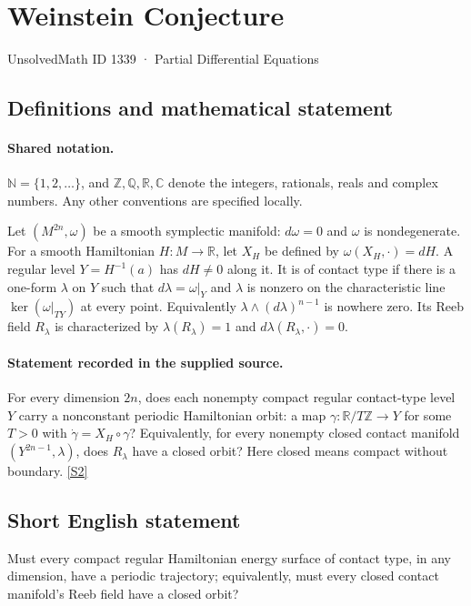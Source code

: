 \documentclass[11pt]{article}
\newcommand{\sref}[2]{\hyperlink{source:#1:#2}{[S#2]}}
\begin{document}
\setcounter{section}{1338}
\section{Weinstein Conjecture}\label{1339}
{\small\sffamily UnsolvedMath ID 1339 · Partial Differential Equations}
\subsection{Definitions and mathematical statement}

\paragraph{Shared notation.}$\mathbb N=\{1,2,\ldots\}$, and $\mathbb Z,\mathbb Q,\mathbb R,\mathbb C$ denote the integers, rationals, reals and complex numbers. Any other conventions are specified locally.


Let $(M^{2n},\omega)$ be a smooth symplectic manifold: $d\omega=0$ and $\omega$ is nondegenerate. For a smooth Hamiltonian $H:M\to\mathbb R$, let $X_H$ be defined by $\omega(X_H,\cdot)=dH$. A regular level $Y=H^{-1}(a)$ has $dH\ne0$ along it. It is of contact type if there is a one-form $\lambda$ on $Y$ such that $d\lambda=\omega|_Y$ and $\lambda$ is nonzero on the characteristic line $\ker(\omega|_{TY})$ at every point. Equivalently $\lambda\wedge(d\lambda)^{n-1}$ is nowhere zero. Its Reeb field $R_\lambda$ is characterized by $\lambda(R_\lambda)=1$ and $d\lambda(R_\lambda,\cdot)=0$.
\paragraph{Statement recorded in the supplied source.}
For every dimension $2n$, does each nonempty compact regular contact-type level $Y$ carry a nonconstant periodic Hamiltonian orbit: a map $\gamma:\mathbb R/T\mathbb Z\to Y$ for some $T>0$ with $\dot\gamma=X_H\circ\gamma$? Equivalently, for every nonempty closed contact manifold $(Y^{2n-1},\lambda)$, does $R_\lambda$ have a closed orbit? Here closed means compact without boundary. \sref{1339}{2}
\subsection{Short English statement}
Must every compact regular Hamiltonian energy surface of contact type, in any dimension, have a periodic trajectory; equivalently, must every closed contact manifold’s Reeb field have a closed orbit?
\end{document}

